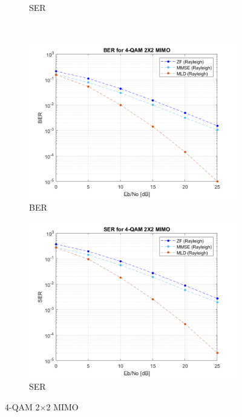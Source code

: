 \documentclass{article}
\begin{document}
\begin{figure}[H]
\begin{subfigure}{0.5\textwidth}
		\caption{SER}
	\end{subfigure}\\%
	\begin{subfigure}{0.5\textwidth}
		\centerline{\includegraphics[width=1\textwidth]{a_Eb_BER.png}}
		\caption{BER}
	\end{subfigure}%
	\begin{subfigure}{0.5\textwidth}
		\centerline{\includegraphics[width=1\textwidth]{a_Eb_SER.png}}
		\caption{SER}
	\end{subfigure}%
	\caption{4-QAM 2$\times$2 MIMO}
\end{figure}
\end{document}
